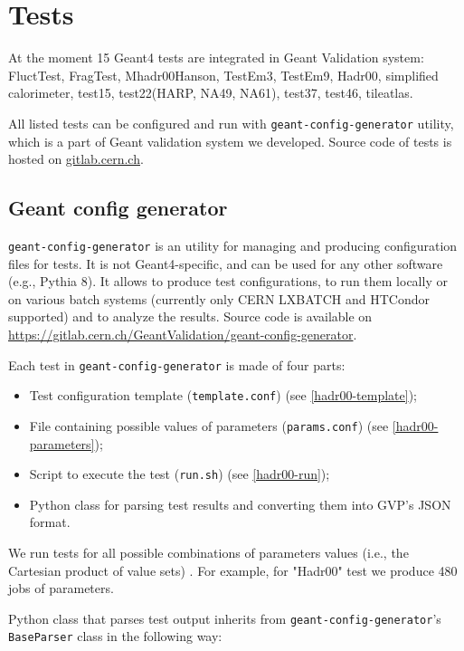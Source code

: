 \section{Tests}
\label{sec-tests}

At the moment 15 Geant4 tests are integrated in Geant Validation system: FluctTest, FragTest, Mhadr00Hanson, TestEm3, TestEm9, Hadr00, simplified calorimeter, test15, test22(HARP, NA49, NA61), test37, test46, tileatlas.

All listed tests can be configured and run with {\tt geant-config-generator} utility, which is a part of Geant validation system we developed. Source code of tests is hosted on \url{gitlab.cern.ch}.

\subsection{Geant config generator}
\label{sec-geant-config-generator}

{\tt geant-config-generator} is an utility for managing and producing configuration files for tests. It is not Geant4-specific, and can be used for any other software (e.g., Pythia 8). It allows to produce test configurations, to run them locally or on various batch systems (currently only CERN LXBATCH and HTCondor supported) and to analyze the results. Source code is available on \url{https://gitlab.cern.ch/GeantValidation/geant-config-generator}.

Each test in {\tt geant-config-generator} is made of four parts:

\begin{itemize}
	\item Test configuration template ({\tt template.conf}) (see \ref{hadr00-template});
	\item File containing possible values of parameters ({\tt params.conf}) (see \ref{hadr00-parameters});
	\item Script to execute the test ({\tt run.sh}) (see \ref{hadr00-run});
	\item Python class for parsing test results and converting them into GVP's JSON format.
\end{itemize}

We run tests for all possible combinations of parameters values (i.e., the Cartesian product of value sets) . For example, for "Hadr00" test we produce 480 jobs of parameters.

Python class that parses test output inherits from {\tt geant-config-generator}'s {\tt BaseParser} class in the following way:

